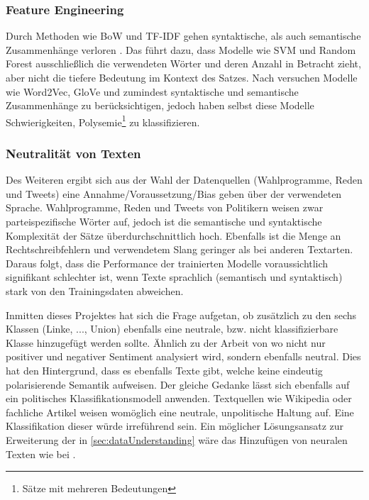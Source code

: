 \subsubsection{Feature Engineering}


Durch Methoden wie \ac{BoW} und \ac{TF-IDF} gehen syntaktische, als auch semantische Zusammenhänge verloren \autocite[48\psq]{kowsari_text_2019}. Das führt dazu, dass Modelle wie \ac{SVM} und Random Forest ausschließlich die verwendeten Wörter und deren Anzahl in Betracht zieht, aber nicht die tiefere Bedeutung im Kontext des Satzes. Nach \textcite{kowsari_text_2019} versuchen Modelle wie Word2Vec, GloVe und \ft zumindest syntaktische und semantische Zusammenhänge zu berücksichtigen, jedoch haben selbst diese Modelle Schwierigkeiten, Polysemie\footnote{Sätze mit mehreren Bedeutungen} zu klassifizieren.

\subsubsection{Neutralität von Texten} %


Des Weiteren ergibt sich aus der Wahl der Datenquellen (Wahlprogramme, Reden und Tweets) eine Annahme/Voraussetzung/Bias geben über der verwendeten Sprache. Wahlprogramme, Reden und Tweets von Politikern weisen zwar parteispezifische Wörter auf, jedoch ist die semantische und syntaktische Komplexität der Sätze überdurchschnittlich hoch. Ebenfalls ist die Menge an Rechtschreibfehlern und verwendetem Slang geringer als bei anderen Textarten. Daraus folgt, dass die Performance der trainierten Modelle voraussichtlich signifikant schlechter ist, wenn Texte sprachlich (semantisch und syntaktisch) stark von den Trainingsdaten abweichen.


Inmitten dieses Projektes hat sich die Frage aufgetan, ob zusätzlich zu den sechs Klassen (Linke, ..., Union) ebenfalls eine neutrale, bzw. nicht klassifizierbare Klasse hinzugefügt werden sollte. Ähnlich zu der Arbeit von \textcite{guhr_training_2020} wo nicht nur positiver und negativer Sentiment analysiert wird, sondern ebenfalls neutral. Dies hat den Hintergrund, dass es ebenfalls Texte gibt, welche keine eindeutig polarisierende Semantik aufweisen. Der gleiche Gedanke lässt sich ebenfalls auf ein politisches Klassifikationsmodell anwenden. Textquellen wie Wikipedia oder fachliche Artikel weisen womöglich eine neutrale, unpolitische Haltung auf. Eine Klassifikation dieser würde irreführend sein. Ein möglicher Lösungsansatz zur Erweiterung der in \autoref{sec:dataUnderstanding} wäre das Hinzufügen von neuralen Texten wie bei \textcite{guhr_training_2020}.

